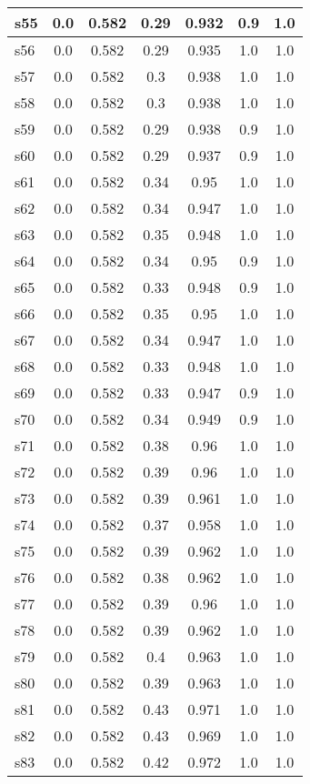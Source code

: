 \documentclass{article}
\begin{document}
\begin{tabular}{|l|c|c|c|c|c|c|}
s55 &0.0 & 0.582 & 0.29 & 0.932 & 0.9 & 1.0\\
\hline
s56 &0.0 & 0.582 & 0.29 & 0.935 & 1.0 & 1.0\\
\hline
s57 &0.0 & 0.582 & 0.3 & 0.938 & 1.0 & 1.0\\
\hline
s58 &0.0 & 0.582 & 0.3 & 0.938 & 1.0 & 1.0\\
\hline
s59 &0.0 & 0.582 & 0.29 & 0.938 & 0.9 & 1.0\\
\hline
s60 &0.0 & 0.582 & 0.29 & 0.937 & 0.9 & 1.0\\
\hline
s61 &0.0 & 0.582 & 0.34 & 0.95 & 1.0 & 1.0\\
\hline
s62 &0.0 & 0.582 & 0.34 & 0.947 & 1.0 & 1.0\\
\hline
s63 &0.0 & 0.582 & 0.35 & 0.948 & 1.0 & 1.0\\
\hline
s64 &0.0 & 0.582 & 0.34 & 0.95 & 0.9 & 1.0\\
\hline
s65 &0.0 & 0.582 & 0.33 & 0.948 & 0.9 & 1.0\\
\hline
s66 &0.0 & 0.582 & 0.35 & 0.95 & 1.0 & 1.0\\
\hline
s67 &0.0 & 0.582 & 0.34 & 0.947 & 1.0 & 1.0\\
\hline
s68 &0.0 & 0.582 & 0.33 & 0.948 & 1.0 & 1.0\\
\hline
s69 &0.0 & 0.582 & 0.33 & 0.947 & 0.9 & 1.0\\
\hline
s70 &0.0 & 0.582 & 0.34 & 0.949 & 0.9 & 1.0\\
\hline
s71 &0.0 & 0.582 & 0.38 & 0.96 & 1.0 & 1.0\\
\hline
s72 &0.0 & 0.582 & 0.39 & 0.96 & 1.0 & 1.0\\
\hline
s73 &0.0 & 0.582 & 0.39 & 0.961 & 1.0 & 1.0\\
\hline
s74 &0.0 & 0.582 & 0.37 & 0.958 & 1.0 & 1.0\\
\hline
s75 &0.0 & 0.582 & 0.39 & 0.962 & 1.0 & 1.0\\
\hline
s76 &0.0 & 0.582 & 0.38 & 0.962 & 1.0 & 1.0\\
\hline
s77 &0.0 & 0.582 & 0.39 & 0.96 & 1.0 & 1.0\\
\hline
s78 &0.0 & 0.582 & 0.39 & 0.962 & 1.0 & 1.0\\
\hline
s79 &0.0 & 0.582 & 0.4 & 0.963 & 1.0 & 1.0\\
\hline
s80 &0.0 & 0.582 & 0.39 & 0.963 & 1.0 & 1.0\\
\hline
s81 &0.0 & 0.582 & 0.43 & 0.971 & 1.0 & 1.0\\
\hline
s82 &0.0 & 0.582 & 0.43 & 0.969 & 1.0 & 1.0\\
\hline
s83 &0.0 & 0.582 & 0.42 & 0.972 & 1.0 & 1.0\\

\end{tabular}
\end{document}

